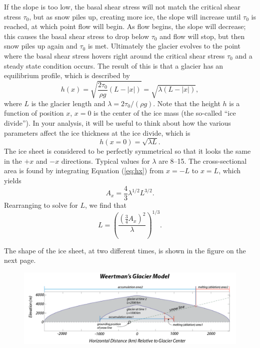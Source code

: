 \documentclass[11pt,letterpaper]{article}
\begin{document}
If the slope is too low, the basal shear stress will not match the critical shear stress $\tau_0$, but as snow piles up, creating more ice, the slope will increase until $\tau_0$ is reached, at which point flow will begin. As flow begins, the slope will decrease; this causes the basal shear stress to drop below $\tau_0$ and flow will stop, but then snow piles up again and $\tau_0$ is met. Ultimately the glacier evolves to the point where the basal shear stress hovers right around the critical shear stress $\tau_0$ and a steady state condition occurs. The result of this is that a glacier has an equilibrium profile, which is described by 
\begin{equation}
h(x) =  \sqrt{\frac{2\tau_0}{\rho g}(L-|x|)} = \sqrt{\lambda(L-|x|)},
\label{eq:hx}
\end{equation}
where $L$ is the glacier length and $\lambda=2\tau_0/(\rho g)$. Note that the height $h$ is a function of position $x$, $x=0$ is the center of the ice mass (the so-called ``ice divide''). In your analysis, it will be useful to think about how the various parameters affect the ice thickness at the ice divide, which is
\begin{equation}
h(x=0) = \sqrt{\lambda L}.
\end{equation}
The ice sheet is considered to be perfectly symmetrical so that it looks the same in the $+x$ and $-x$ directions. Typical values for $\lambda$ are 8--15. The cross-sectional area is found by integrating Equation (\ref{eq:hx}) from $x=-L$ to $x=L$, which yields
\begin{equation}
A_x = \frac{4}{3}\lambda^{1/2}L^{3/2}.
\end{equation}
Rearranging to solve for $L$, we find that
\begin{equation}
L = \left(\frac{\left(\frac{3}{4}A_x\right)^2}{\lambda}\right)^{1/3}.
\end{equation}

The shape of the ice sheet, at two different times, is shown in the figure on the next page.
\begin{figure}
\begin{center}
\includegraphics[width=\textwidth]{./weertmans_glacier_model_v2.png}
\end{center}
\label{fig:weertman}
\end{figure}
\end{document}
